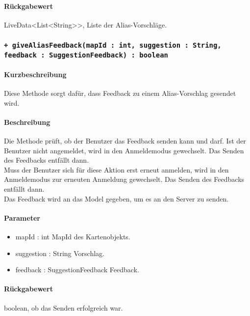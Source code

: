 \paragraph*{Rückgabewert}
LiveData<List<String>>, Liste der Alias-Vorschläge.

\subsubsection*{\texttt{+ giveAliasFeedback(mapId : int, suggestion : String, feedback : SuggestionFeedback) : boolean}}%
\paragraph*{Kurzbeschreibung}
Diese Methode sorgt dafür, dass Feedback zu einem Alias-Vorschlag gesendet wird.
\paragraph*{Beschreibung}
Die Methode prüft, ob der Benutzer das Feedback senden kann und darf.
Ist der Benutzer nicht angemeldet, wird in den Anmeldemodus gewechselt. Das Senden des Feedbacks entfällt dann.\\
Muss der Benutzer sich für diese Aktion erst erneut anmelden, wird in den Anmeldemodus zur erneuten Anmeldung gewechselt. Das Senden des Feedbacks entfällt dann.\\
Das Feedback wird an das Model gegeben, um es an den Server zu senden.
\paragraph*{Parameter}
\begin{itemize}
    \item mapId : int MapId des Kartenobjekts.
    \item suggestion : String Vorschlag. 
    \item feedback : SuggestionFeedback Feedback.
\end{itemize}
\paragraph*{Rückgabewert}
boolean, ob das Senden erfolgreich war.